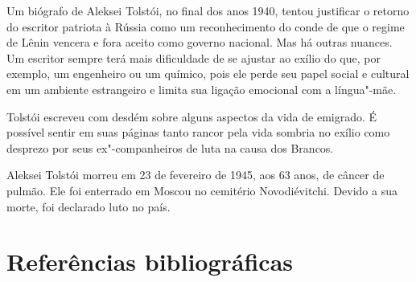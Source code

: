 \documentclass[11pt]{extarticle}
\begin{document}
Um biógrafo de Aleksei Tolstói, no final dos anos 1940, tentou
justificar o retorno do escritor patriota à Rússia como um
reconhecimento do conde de que o regime de Lênin vencera e fora aceito
como governo nacional. Mas há outras nuances. Um escritor sempre terá
mais dificuldade de se ajustar ao exílio do que, por exemplo, um
engenheiro ou um químico, pois ele perde seu papel social e cultural em
um ambiente estrangeiro e limita sua ligação emocional com a língua"-mãe.

Tolstói escreveu com desdém sobre alguns aspectos da vida de emigrado. É
possível sentir em suas páginas tanto rancor pela vida sombria no exílio
como desprezo por seus ex"-companheiros de luta na causa dos Brancos.

Aleksei Tolstói morreu em 23 de fevereiro de 1945, aos 63 anos, de
câncer de pulmão. Ele foi enterrado em Moscou no cemitério
Novodiévitchi. Devido a sua morte, foi declarado luto no país.

\section{Referências bibliográficas}
\end{document}
